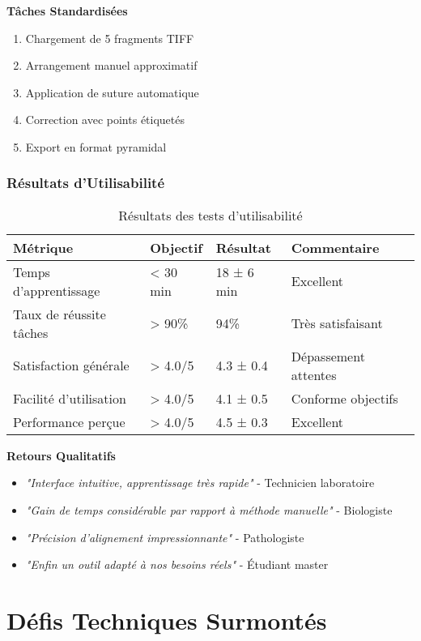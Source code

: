 \documentclass[12pt,a4paper]{report}
\begin{document}
\textbf{Tâches Standardisées}
\begin{enumerate}
\item Chargement de 5 fragments TIFF
\item Arrangement manuel approximatif
\item Application de suture automatique
\item Correction avec points étiquetés
\item Export en format pyramidal
\end{enumerate}

\subsubsection{Résultats d'Utilisabilité}

\begin{table}[H]
\centering
\begin{tabular}{|p{4cm}|p{2cm}|p{2cm}|p{3cm}|}
\hline
\textbf{Métrique} & \textbf{Objectif} & \textbf{Résultat} & \textbf{Commentaire} \\
\hline
Temps d'apprentissage & < 30 min & 18 ± 6 min & Excellent \\
\hline
Taux de réussite tâches & > 90\% & 94\% & Très satisfaisant \\
\hline
Satisfaction générale & > 4.0/5 & 4.3 ± 0.4 & Dépassement attentes \\
\hline
Facilité d'utilisation & > 4.0/5 & 4.1 ± 0.5 & Conforme objectifs \\
\hline
Performance perçue & > 4.0/5 & 4.5 ± 0.3 & Excellent \\
\hline
\end{tabular}
\caption{Résultats des tests d'utilisabilité}
\end{table}

\textbf{Retours Qualitatifs}
\begin{itemize}
\item \textit{"Interface intuitive, apprentissage très rapide"} - Technicien laboratoire
\item \textit{"Gain de temps considérable par rapport à méthode manuelle"} - Biologiste
\item \textit{"Précision d'alignement impressionnante"} - Pathologiste
\item \textit{"Enfin un outil adapté à nos besoins réels"} - Étudiant master
\end{itemize}

\section{Défis Techniques Surmontés}
\end{document}
